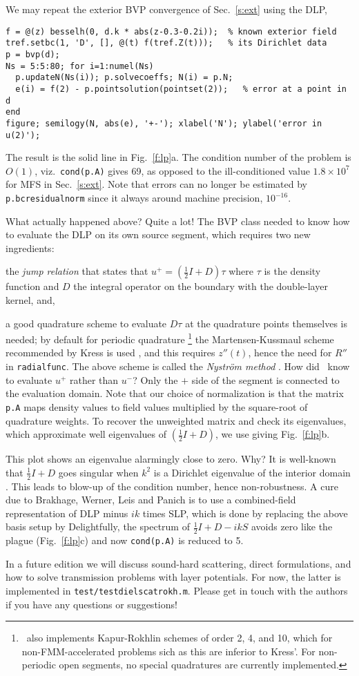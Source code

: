We may repeat the exterior BVP convergence of Sec.~\ref{s:ext} using the DLP,
\begin{verbatim}
f = @(z) besselh(0, d.k * abs(z-0.3-0.2i));  % known exterior field
tref.setbc(1, 'D', [], @(t) f(tref.Z(t)));   % its Dirichlet data
p = bvp(d);
Ns = 5:5:80; for i=1:numel(Ns)
  p.updateN(Ns(i)); p.solvecoeffs; N(i) = p.N;
  e(i) = f(2) - p.pointsolution(pointset(2));   % error at a point in d
end
figure; semilogy(N, abs(e), '+-'); xlabel('N'); ylabel('error in u(2)');
\end{verbatim}
The result is the solid line in Fig.~\ref{f:lp}a.
The condition number of the problem is $O(1)$, viz.\ {\tt cond(p.A)} gives
69, as opposed to the ill-conditioned value
$1.8\times 10^7$ for MFS in Sec.~\ref{s:ext}.
Note that errors can no longer be estimated by {\tt p.bcresidualnorm} since it
always around machine precision, $10^{-16}$.

What actually happened above? Quite a lot! The BVP class needed to know how
to evaluate the DLP on its own source segment, which requires two new
ingredients:
\ben
\item the {\em jump relation} that states that
$u^+ = (\frac{1}{2}I + D)\tau$ where $\tau$ is the density function and
$D$ the integral operator on the boundary with the double-layer kernel, and,
\item a good quadrature scheme to evaluate $D\tau$ at the quadrature points
themselves is needed; by default for periodic quadrature%
  \footnote{\mpspack\ also implements Kapur-Rokhlin schemes of order 2, 4,
    and 10, which for non-FMM-accelerated problems sich as this are inferior
    to Kress'. For non-periodic open segments, no special quadratures are
    currently implemented.}
the Martensen-Kussmaul scheme recommended by Kress is used \cite{coltonkress},
and this requires $z''(t)$, hence the need for $R''$ in {\tt radialfunc}.
\een
The above scheme is called the {\em Nystr\"{o}m method} \cite{coltonkress}.
How did \mpspack\ know to evaluate $u^+$ rather than $u^-$? Only the
$+$ side of the segment is connected to the evaluation domain.
Note that our choice of normalization is that the matrix
{\tt p.A} maps density values to field values multiplied by the square-root
of quadrature weights. To recover the unweighted matrix and check its
eigenvalues, which approximate well eigenvalues of $(\frac{1}{2}I + D)$,
we use
giving Fig.~\ref{f:lp}b.

This plot shows an eigenvalue alarmingly close to zero. Why?
It is well-known that $\frac{1}{2}I + D$ goes singular when $k^2$ is
a Dirichlet eigenvalue of the interior domain \cite{coltonkress}.
This leads to blow-up of the condition number, hence non-robustness.
A cure due to Brakhage, Werner, Leis and Panich \cite{coltonkress}
is to use a combined-field representation of DLP minus $ik$ times SLP,
which is done by replacing the above basis setup by
Delightfully, the spectrum of $\frac{1}{2}I + D - ikS$ avoids
zero like the plague (Fig.~\ref{f:lp}c) and now {\tt cond(p.A)} is reduced to 5.

In a future edition we will discuss
sound-hard scattering, direct formulations, and
how to solve transmission problems
with layer potentials. For now, the latter
is implemented in {\tt test/testdielscatrokh.m}.
Please get in touch with the authors if you have any questions
or suggestions!
